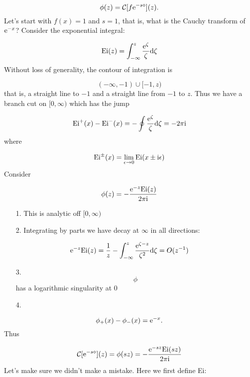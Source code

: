 \documentclass[12pt,a4paper]{article}
\def\D{ {\rm d} }
\def\I{ {\rm i} }
\def\E{ {\rm e} }
\def\CC{ {\cal C} }
\begin{document}
\[
\phi(z) = \CC[f \E^{-s \diamond}](z).
\]
Let's start with $f(x) = 1$ and $s = 1$, that is, what is the Cauchy transform of $\E^{-x}$? Consider the exponential integral:

\[
{\rm Ei}(z) = \int_{-\infty}^z {\E^\zeta \over \zeta} \D \zeta
\]
Without loss of generality, the contour of integration is

\[
(-\infty,-1) \cup [-1, z)
\]
that is, a straight line to $-1$ and a straight line from $-1$ to $z$. Thus we have a branch cut on $[0,\infty)$ which has the jump

\[
{\rm Ei}^+(x) - {\rm Ei}^-(x) = -\oint {\E^\zeta \over \zeta} \D \zeta = -2 \pi \I
\]
where

\[
{\rm Ei}^\pm(x) = \lim_{\epsilon \rightarrow 0} {\rm Ei}(x\pm\I \epsilon)
\]
Consider

\[
\phi(z) = -{\E^{-z} {\rm Ei}(z) \over 2 \pi \I }
\]
\begin{itemize}
\item[1. ] This is analytic off $[0,\infty)$


\item[2. ] Integrating by parts we have decay at $\infty$ in all directions:

\end{itemize}
\[
\E^{-z} {\rm Ei}(z) = {1  \over z}  - \int_{-\infty}^z {\E^{\zeta-z} \over \zeta^2} \D \zeta = O(z^{-1})
\]
\begin{itemize}
\item[3. ] \[
\phi
\]
has a logarithmic singularity at 0


\item[4. ] \end{itemize}
\[
\phi_+(x) - \phi_-(x) = \E^{-x}.
\]
Thus

\[
\CC[ \E^{-s \diamond}](z) = \phi(s z) = - {\E^{-s z} {\rm Ei}(s z)  \over 2 \pi \I}
\]
Let's make sure we didn't make a mistake. Here we first define Ei:
\end{document}
